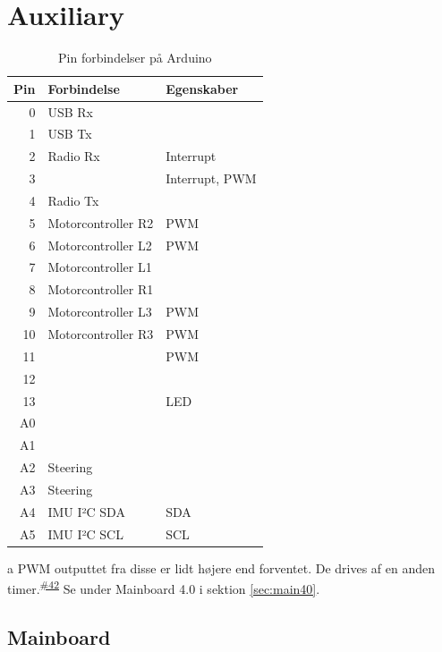 \documentclass[a4paper,11pt,oneside,article,danish,table]{memoir}
\newcommand{\issue}[1]{\textsuperscript{\textcolor{blue!80!black}{\href{https://github.com/neic/Swagway/issues/#1}{\##1}}}}
\begin{document}
\chapter{Auxiliary}
\begin{table}[htbp]
  \caption{Pin forbindelser på Arduino}
  \centering
  \begin{threeparttable}
    \begin{tabular}{rll}
      \toprule
      Pin & Forbindelse & Egenskaber\\
      \midrule
      0 & USB Rx & \\
      1 & USB Tx & \\
      2 & Radio Rx & Interrupt\\
      3 & & Interrupt, PWM\\
      4 & Radio Tx & \\
      5 & Motorcontroller R2 & PWM\tnote{a}\\
      6 & Motorcontroller L2 & PWM\tnote{a}\\
      7 & Motorcontroller L1 & \\
      8 & Motorcontroller R1 & \\
      9 & Motorcontroller L3 & PWM\\
      10 & Motorcontroller R3 & PWM\\
      11 & & PWM\\
      12 & & \\
      13 & & LED\\
      A0 & & \\
      A1 & & \\
      A2 & Steering & \\
      A3 & Steering & \\
      A4 & IMU I²C SDA & SDA\\
      A5 & IMU I²C SCL & SCL
    \end{tabular}
    \begin{tablenotes}
      \item[a]{PWM outputtet fra disse er lidt højere end forventet. De drives af en anden timer.\issue{42} Se under Mainboard 4.0 i sektion \ref{sec:main40}.}
    \end{tablenotes}
  \end{threeparttable}
\end{table}

\section{Mainboard}
\end{document}
